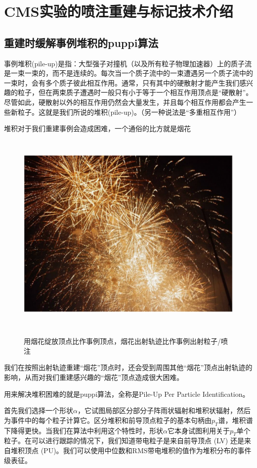 \chapter{CMS实验的喷注重建与标记技术介绍}
\label{chap3}
\fontsize{12bp}{14.4pt}
\section{重建时缓解事例堆积的puppi算法}
事例堆积(pile-up)是指：大型强子对撞机（以及所有粒子物理加速器）上的质子流是一束一束的，而不是连续的。每次当一个质子流中的一束遭遇另一个质子流中的一束时，会有多个质子彼此相互作用。通常，只有其中的硬散射才能产生我们感兴趣的粒子，但在两束质子遭遇时一般只有小于等于一个相互作用顶点是“硬散射”。尽管如此，硬散射以外的相互作用仍然会大量发生，并且每个相互作用都会产生一些新粒子。这就是我们所说的堆积(pile-up)。（另一种说法是“多重相互作用”）

堆积对于我们重建事例会造成困难，一个通俗的比方就是烟花
\begin{figure}[H]
 \centering
 \caption{用烟花绽放顶点比作事例顶点，烟花出射轨迹比作事例出射粒子/喷注}
 \includegraphics[height=10cm, width=13cm]{pictures/firework.png}
 \label{fig2.0}
\end{figure}
我们在按照出射轨迹重建“烟花”顶点时，还会受到周围其他“烟花”顶点出射轨迹的影响，从而对我们重建感兴趣的“烟花”顶点造成很大困难。

用来解决堆积困难的就是puppi算法，全称是Pile-Up Per Particle Identification。

首先我们选择一个形状$\alpha$，它试图局部区分部分子阵雨状辐射和堆积状辐射，然后为事件中的每个粒子计算它。区分堆积和前导顶点粒子的基本句柄由$p_T$谱，堆积谱下降得更快。当我们在算法中利用这个特性时，形状$\alpha$它本身试图利用关于$p_T$单个粒子。在可以进行跟踪的情况下，我们知道带电粒子是来自前导顶点 (LV) 还是来自堆积顶点 (PU)。我们可以使用中位数和RMS带电堆积的值作为堆积分布的事件级表征。

